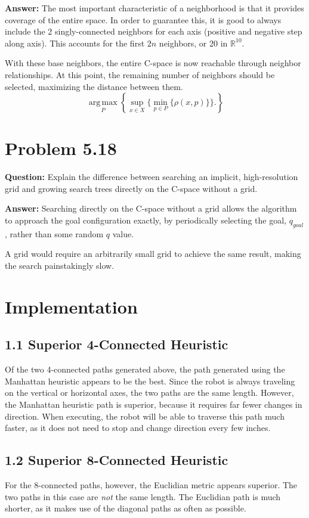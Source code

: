 \documentclass[10pt,letterpaper]{article}
\begin{document}
\textbf{Answer: } The most important characteristic of a neighborhood is that it provides coverage of the entire space. In order to guarantee this, it is good to always include the 2 singly-connected neighbors for each axis (positive and negative step along axis). This accounts for the first $2n$ neighbors, or 20 in $\mathbb{R}^{10}$. 

With these base neighbors, the entire C-space is now reachable through neighbor relationships. At this point, the remaining number of neighbors should be selected, maximizing the distance between them. 
\begin{equation}
\operatorname*{arg\,max}_P \left\lbrace 	\sup_{x \in X} \big\{ \min_{p \in P} \big\{ \rho(x,p) \big\}\big\}. \right\rbrace
\end{equation}


\section{Problem 5.18}
\textbf{Question: } Explain the difference between searching an implicit, high-resolution grid and growing search trees directly on the C-space without a grid.

\textbf{Answer: } Searching directly on the C-space without a grid allows the algorithm to approach the goal configuration exactly, by periodically selecting the goal, $q_{goal}$, rather than some random $q$ value. 

A grid would require an arbitrarily small grid to achieve the same result, making the search painstakingly slow. 

\pagebreak
\section{Implementation}
\subsection{1.1 Superior 4-Connected Heuristic}
Of the two 4-connected paths generated above, the path generated using the Manhattan heuristic appears to be the best. Since the robot is always traveling on the vertical or horizontal axes, the two paths are the same length. However, the Manhattan heuristic path is superior, because it requires far fewer changes in direction. When executing, the robot will be able to traverse this path much faster, as it does not need to stop and change direction every few inches. 
\subsection{1.2 Superior 8-Connected Heuristic}
For the 8-connected paths, however, the Euclidian metric appears superior. The two paths in this case are \emph{not} the same length. The Euclidian path is much shorter, as it makes use of the diagonal paths as often as possible. 
\end{document}
